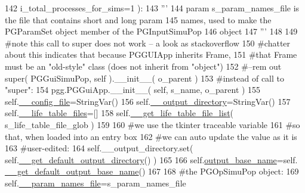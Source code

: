 \begin{DoxyCode}
142                             i\_total\_processes\_for\_sims=1 ):
143         \textcolor{stringliteral}{'''}
144 \textcolor{stringliteral}{        param s\_param\_names\_file is the file that contains short and long param}
145 \textcolor{stringliteral}{        names, used to make the PGParamSet object  member of the PGInputSimuPop }
146 \textcolor{stringliteral}{        object}
147 \textcolor{stringliteral}{        '''}
148 
149         \textcolor{comment}{#note this call to super does not work -- a look as stackoverflow}
150         \textcolor{comment}{#chatter about this indicates that because PGGUIApp inherits Frame,}
151         \textcolor{comment}{#that Frame must be an "old-style" class (does not inherit from "object")}
152         \textcolor{comment}{#--rem out super( PGGuiSimuPop, self ).\_\_init\_\_( o\_parent )}
153         \textcolor{comment}{#instead of call to "super":}
154         pgg.PGGuiApp.\_\_init\_\_( self, s\_name, o\_parent )
155         self.\hyperlink{classnegui_1_1pgguisimupop__experimental2_1_1PGGuiSimuPop_a454d7267b2d85239bd8d9f97dc8bafdb}{\_\_config\_file}=StringVar()
156         self.\hyperlink{classnegui_1_1pgguisimupop__experimental2_1_1PGGuiSimuPop_a4ecb03db1b464e6b4b926212b735e4ae}{\_\_output\_directory}=StringVar()
157         self.\hyperlink{classnegui_1_1pgguisimupop__experimental2_1_1PGGuiSimuPop_a3a0f759c67a49de2d95e6a673827ff95}{\_\_life\_table\_files}=[]
158         self.\hyperlink{classnegui_1_1pgguisimupop__experimental2_1_1PGGuiSimuPop_a1299b2001b3a26b90e082bc279c19620}{\_\_get\_life\_table\_file\_list}( s\_life\_table\_file\_glob )
159 
160         \textcolor{comment}{#we use the tkinter traceable variable}
161         \textcolor{comment}{#so that, when loaded into an entry box}
162         \textcolor{comment}{#we can auto update the value as it is }
163         \textcolor{comment}{#user-edited:}
164         self.\_\_output\_directory.set( self.\hyperlink{classnegui_1_1pgguisimupop__experimental2_1_1PGGuiSimuPop_a58bee687437604f3ae4d385edc6d290f}{\_\_get\_default\_output\_directory}() )
165 
166         self.\hyperlink{classnegui_1_1pgguisimupop__experimental2_1_1PGGuiSimuPop_a85fd2199bf4221f68dabf446d33027b9}{output\_base\_name}=self.
      \hyperlink{classnegui_1_1pgguisimupop__experimental2_1_1PGGuiSimuPop_a07393a583b54e18ca04cb59926036ac1}{\_\_get\_default\_output\_base\_name}() 
167 
168         \textcolor{comment}{#the PGOpSimuPop object:}
169         self.\hyperlink{classnegui_1_1pgguisimupop__experimental2_1_1PGGuiSimuPop_a0416a4929f298a948da8ab192d60bf8d}{\_\_param\_names\_file}=s\_param\_names\_file

\end{DoxyCode}
